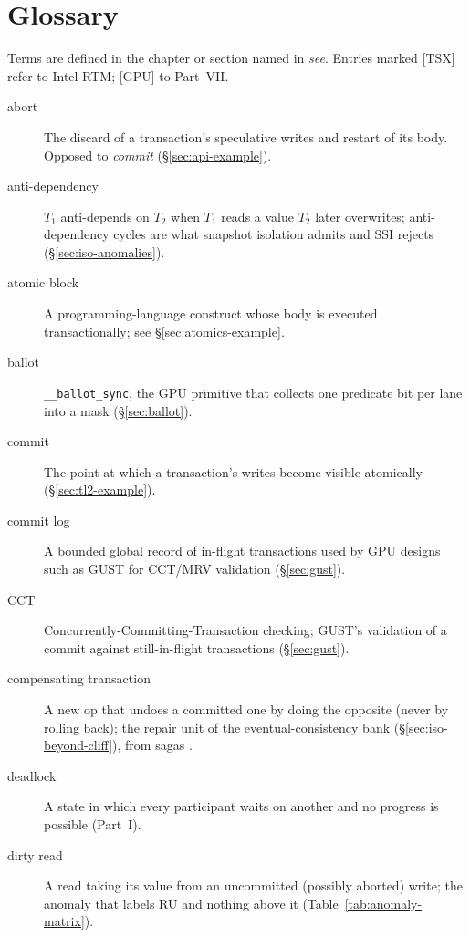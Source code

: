 \chapter{Glossary}
\label{chap:glossary}
Terms are defined in the chapter or section named in \emph{see}. Entries marked
[TSX] refer to Intel RTM; [GPU] to Part~VII.

\begin{description}
    \item[abort]  The discard of a transaction's speculative
          writes and restart of its body. Opposed to \emph{commit}
          (\S\ref{sec:api-example}).
    \item[anti-dependency]  $T_1$ anti-depends on $T_2$ when $T_1$ reads a value $T_2$ later overwrites; anti-dependency cycles are what snapshot isolation admits and SSI rejects (\S\ref{sec:iso-anomalies}).
    \item[atomic block]  A programming-language construct
          whose body is executed transactionally; see \S\ref{sec:atomics-example}.
    \item[ballot]  \texttt{\_\_ballot\_sync}, the GPU primitive
          that collects one predicate bit per lane into a mask
          (\S\ref{sec:ballot}).
    \item[commit]  The point at which a transaction's writes
          become visible atomically (\S\ref{sec:tl2-example}).
    \item[commit log]  A bounded global record of in-flight
          transactions used by GPU designs such as GUST for CCT/MRV
          validation (\S\ref{sec:gust}).
    \item[CCT]  Concurrently-Committing-Transaction checking; GUST's
          validation of a commit against still-in-flight transactions
          (\S\ref{sec:gust}).
    \item[compensating transaction]  A new op
          that undoes a committed one by doing the opposite (never by rolling
          back); the repair unit of the eventual-consistency bank
          (\S\ref{sec:iso-beyond-cliff}), from sagas \cite{garciamolina87sagas}.
    \item[deadlock]  A state in which every participant waits
          on another and no progress is possible (Part~I).
    \item[dirty read]  A read taking its value from an uncommitted (possibly aborted) write; the anomaly that labels RU and nothing above it (Table~\ref{tab:anomaly-matrix}).

\end{description}

